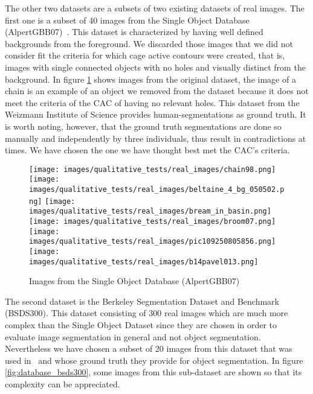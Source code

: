  The other two datasets are a subsets of two existing datasets of real images. The first one is a subset of 40 images from the Single Object Database (AlpertGBB07)~\cite{AlpertGBB07}. This dataset is characterized by having well defined backgrounds from the foreground. We discarded those images that we did not consider fit the criteria for which cage active contours were created, that is, images with single connected objects with no holes and visually distinct from the background. In figure \ref{fig:database_sod} shows images from the original dataset, the image of a chain is an example of an object we removed from the dataset because it does not meet the criteria of the CAC of having no relevant holes. 
 This dataset from the Weizmann Institute of Science provides human-segmentations as ground truth. It is worth noting, however, that the ground truth segmentations are done so manually and independently by three individuals, thus result in contradictions at times. We have chosen the one we have thought best met the CAC's criteria.
 
 \begin{figure}[h!]
 	\centering
 	\texttt{[image: images/qualitative\_tests/real\_images/chain98.png]}\hspace{0.025\textwidth}%
 	\texttt{[image: images/qualitative\_tests/real\_images/beltaine\_4\_bg\_050502.png]}\hspace{0.025\textwidth}%
 	\texttt{[image: images/qualitative\_tests/real\_images/bream\_in\_basin.png]}\\[0.2em]
 	
 	\texttt{[image: images/qualitative\_tests/real\_images/broom07.png]}\hspace{0.025\textwidth}%
 	\texttt{[image: images/qualitative\_tests/real\_images/pic109250805856.png]}\hspace{0.025\textwidth}%
 	\texttt{[image: images/qualitative\_tests/real\_images/b14pavel013.png]}\\[0.2em]
 	\caption{Images from the Single Object Database (AlpertGBB07)}
 	\label{fig:database_sod}
 \end{figure}
 
 The second dataset is the Berkeley Segmentation Dataset and Benchmark (BSDS300)\cite{MartinFTM01}. This dataset consisting of 300 real images which are much more complex than the Single Object Dataset since they are chosen in order to evaluate image segmentation in general and not object segmentation. Nevertheless we have chosen a subset of 20 images from this dataset that was used in~\cite{grabCutDS} and whose ground truth they provide for object segmentation. In figure \ref{fig:database_bsds300}, some images from this sub-dataset are shown so that its complexity can be appreciated.

